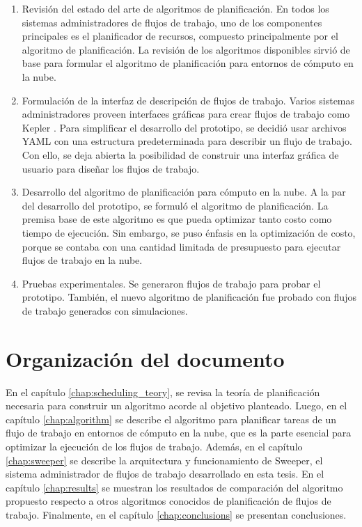 \begin{enumerate}
\item Revisi\'on del estado del arte de algoritmos de planificaci\'on. En todos los sistemas administradores de flujos de trabajo, uno de los componentes principales es el planificador de recursos, compuesto principalmente por el algoritmo de planificaci\'on. La revisi\'on de los algoritmos disponibles sirvi\'o de base para formular el algoritmo de planificaci\'on para entornos de c\'omputo en la nube.
\item Formulación de la interfaz de descripción de flujos de trabajo. Varios sistemas administradores proveen interfaces gr\'aficas para crear flujos de trabajo como Kepler \cite{altintas2016kepler}. Para simplificar el desarrollo del prototipo, se decidi\'o usar archivos YAML con una estructura predeterminada para describir un flujo de trabajo. Con ello, se deja abierta la posibilidad de construir una interfaz gráfica de usuario para diseñar los flujos de trabajo.
\item Desarrollo del algoritmo de planificaci\'on para c\'omputo en la nube. A la par del desarrollo del prototipo, se formul\'o el algoritmo de planificaci\'on. La premisa base de este algoritmo es que pueda optimizar tanto costo como tiempo de ejecuci\'on. Sin embargo, se puso \'enfasis en la optimizaci\'on de costo, porque se contaba con una cantidad limitada de presupuesto para ejecutar flujos de trabajo en la nube. 
\item Pruebas experimentales. Se generaron flujos de trabajo para probar el prototipo. También, el nuevo algoritmo de planificaci\'on fue probado con flujos de trabajo generados con simulaciones.
\end{enumerate}

\section{Organización del documento}

En el capítulo \ref{chap:scheduling_teory}, se revisa la teoría de planificación necesaria para construir un algoritmo acorde al objetivo planteado. Luego, en el capítulo \ref{chap:algorithm} se describe el algoritmo para planificar tareas de un flujo de trabajo en entornos de cómputo en la nube, que es la parte esencial para optimizar la ejecución de los flujos de trabajo. Además, en el capítulo \ref{chap:sweeper} se describe la arquitectura y funcionamiento de Sweeper, el sistema administrador de flujos de trabajo desarrollado en esta tesis. En el cap\'itulo \ref{chap:results} se muestran los resultados de comparaci\'on del algoritmo propuesto respecto a otros algoritmos conocidos de planificaci\'on de flujos de trabajo. Finalmente, en el capítulo \ref{chap:conclusions} se presentan conclusiones.
